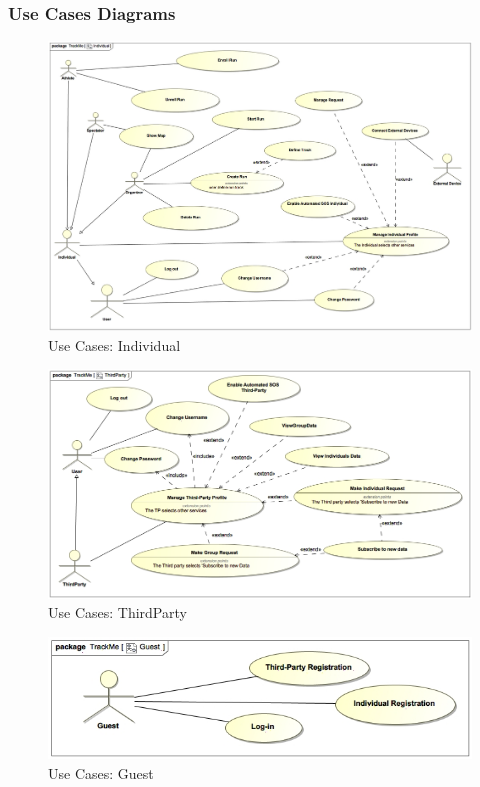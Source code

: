 \documentclass[a4paper]{article}
\begin{document}
        \subsubsection{Use Cases Diagrams}
        \begin{figure}[!htpb]
    	\centering
    	\includegraphics[width=\textwidth]{images/UML/Individual.jpg}
    	\caption{Use Cases: Individual}
    	\end{figure}
    	\begin{figure}[!htpb]
    	\centering
    	\includegraphics[width=\textwidth]{images/UML/ThirdParty.jpg}
    	\caption{Use Cases: ThirdParty}
        \end{figure}
        \begin{figure}[!htpb]
    	\centering
    	\includegraphics[width=\textwidth]{images/UML/Guest.jpg}
    	\caption{Use Cases: Guest}
    	\end{figure}
\end{document}
